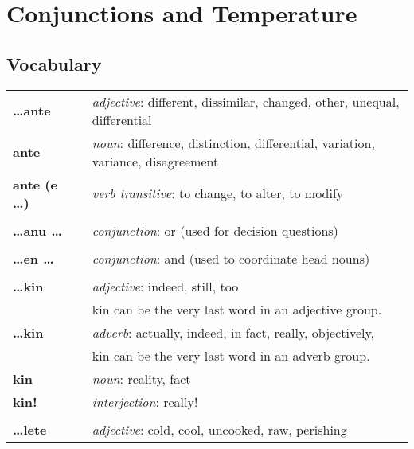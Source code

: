 \section{Conjunctions and Temperature}
%
\subsection*{Vocabulary}
%
\begin{supertabular}{p{2,5cm}|ll}
%
\textbf{\dots ante} && \textit{adjective}: different, dissimilar, changed, other, unequal, differential \\ %
\textbf{ante} && \textit{noun}: difference, distinction, differential, variation, variance, disagreement \\ %
\textbf{ante (e \dots)} && \textit{verb transitive}: to change, to alter, to modify \\ %
 && \\ %
%
\textbf{\dots anu \dots} && \textit{conjunction}: or (used for decision questions) \\ %
 && \\ %
%
\textbf{\dots en \dots} && \textit{conjunction}: and (used to coordinate head nouns) \\ %
 && \\ %
%
\textbf{\dots kin} && \textit{adjective}: indeed, still, too \\ && kin can be the very last word in an adjective group. \\ %
\textbf{\dots kin} && \textit{adverb}: actually, indeed, in fact, really, objectively, \\ && kin can be the very last word in an adverb group. \\%
\textbf{kin} && \textit{noun}: reality, fact \\  %
\textbf{kin!} && \textit{interjection}: really! \\ %
 && \\ %
%
\textbf{\dots lete} && \textit{adjective}: cold, cool, uncooked, raw, perishing \\ %

\end{supertabular}
